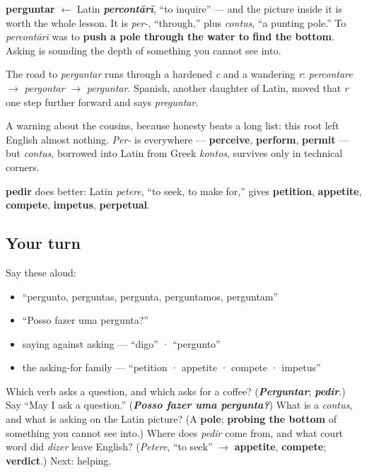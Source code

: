 \begin{cousinweb}
\textbf{perguntar} $\leftarrow$ Latin \emph{\textbf{percontārī}}, \textquotedblleft{}to inquire\textquotedblright{} — and the picture inside it is worth the whole lesson. It is \emph{per-}, \textquotedblleft{}through,\textquotedblright{} plus \emph{contus}, \textquotedblleft{}a punting pole.\textquotedblright{} To \emph{percontārī} was to \textbf{push a pole through the water to find the bottom}. Asking is sounding the depth of something you cannot see into.

The road to \emph{perguntar} runs through a hardened \emph{c} and a wandering \emph{r}: \emph{percontare} $\to$ \emph{pergontar} $\to$ \emph{perguntar}. Spanish, another daughter of Latin, moved that \emph{r} one step further forward and says \emph{preguntar}.

A warning about the cousins, because honesty beats a long list: this root left English almost nothing. \emph{Per-} is everywhere — \textbf{perceive}, \textbf{perform}, \textbf{permit} — but \emph{contus}, borrowed into Latin from Greek \emph{kontos}, survives only in technical corners.

\textbf{pedir} does better: Latin \emph{petere}, \textquotedblleft{}to seek, to make for,\textquotedblright{} gives \textbf{petition}, \textbf{appetite}, \textbf{compete}, \textbf{impetus}, \textbf{perpetual}.
\end{cousinweb}

\subsection*{Your turn}
Say these aloud:

\begin{itemize}
\raggedright
  \item \textquotedblleft{}pergunto, perguntas, pergunta, perguntamos, perguntam\textquotedblright{}
  \item \textquotedblleft{}Posso fazer uma pergunta?\textquotedblright{}
  \item saying against asking — \textquotedblleft{}digo\textquotedblright{} · \textquotedblleft{}pergunto\textquotedblright{}
  \item the asking-for family — \textquotedblleft{}petition · appetite · compete · impetus\textquotedblright{}
\end{itemize}

\begin{tcolorbox}[breakable,colback=teal!4,colframe=teal!35!black,title={Before you move on}]
Which verb asks a question, and which asks for a coffee? (\emph{\textbf{Perguntar}}; \emph{\textbf{pedir}}.) Say \textquotedblleft{}May I ask a question.\textquotedblright{} (\emph{\textbf{Posso fazer uma pergunta?}}) What is a \emph{contus}, and what is asking on the Latin picture? (A \textbf{pole}; \textbf{probing the bottom} of something you cannot see into.) Where does \emph{pedir} come from, and what court word did \emph{dizer} leave English? (\emph{Petere}, \textquotedblleft{}to seek\textquotedblright{} $\to$ \textbf{appetite}, \textbf{compete}; \textbf{verdict}.) Next: helping.
\end{tcolorbox}
